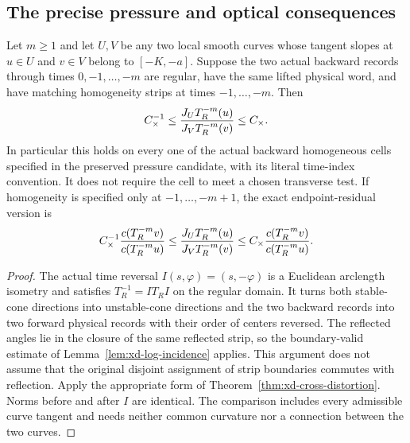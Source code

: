 \subsection{The precise pressure and optical consequences}

\begin{corollary}
\label{cor:xd-backward-curves}
Let $m\ge1$ and let $U,V$ be any two local smooth curves whose
tangent slopes at $u\in U$ and $v\in V$ belong to $[-K,-a]$.
Suppose the two actual backward records through times
$0,-1,\ldots,-m$ are regular, have the same lifted physical word,
and have matching homogeneity strips at times $-1,\ldots,-m$.
Then
\begin{equation}\label{eq:xd-backward-curves}
 C_\times^{-1}\le
 {J_UT_R^{-m}(u)\over J_VT_R^{-m}(v)}\le C_\times.
\end{equation}
In particular this holds on every one of the actual backward
homogeneous cells specified in the preserved pressure candidate,
with its literal time-index convention.  It does not require the
cell to meet a chosen transverse test.  If homogeneity is specified
only at $-1,\ldots,-m+1$, the exact endpoint-residual version is
\[
 C_\times^{-1}{c(T_R^{-m}v)\over c(T_R^{-m}u)}
 \le {J_UT_R^{-m}(u)\over J_VT_R^{-m}(v)}
 \le C_\times{c(T_R^{-m}v)\over c(T_R^{-m}u)}.
\]
\end{corollary}

\begin{proof}
The actual time reversal $I(s,\varphi)=(s,-\varphi)$ is a
Euclidean arclength isometry and satisfies $T_R^{-1}=IT_RI$ on
the regular domain.  It turns both stable-cone directions into
unstable-cone directions and the two backward records into two
forward physical records with their order of centers reversed.
The reflected angles lie in the closure of the same reflected strip,
so the boundary-valid estimate of Lemma~\ref{lem:xd-log-incidence}
applies.  This argument does not assume that the original disjoint
assignment of strip boundaries commutes with reflection.  Apply the
appropriate form of Theorem~\ref{thm:xd-cross-distortion}.
Norms before and after $I$
are identical.  The comparison includes every admissible curve
tangent and needs neither common curvature nor a connection between
the two curves.
\end{proof}

